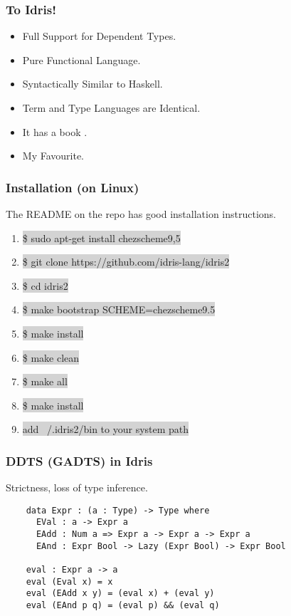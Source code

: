 \documentclass[hyperref={colorlinks = true,linkcolor = blue, citecolor = blue, urlcolor = blue}]{beamer}
\begin{document}
\begin{frame}[fragile]
  \frametitle{To Idris!}
  \begin{itemize}
    \item Full Support for Dependent Types.
    \item Pure Functional Language.
    \item Syntactically Similar to Haskell.
    \item Term and Type Languages are Identical.
    \item It has a book \citep{brady2017type}.
    \item My Favourite.
  \end{itemize}
\end{frame}

\begin{frame}[fragile]
  \frametitle{Installation (on Linux)}
  The README on the repo has good installation instructions.
  \begin{enumerate}
    \item \colorbox{lightgray}{\$ sudo apt-get install chezscheme9,5}
    \item \colorbox{lightgray}{\$ git clone https://github.com/idris-lang/idris2}
    \item \colorbox{lightgray}{\$ cd idris2}
    \item \colorbox{lightgray}{\$ make bootstrap SCHEME=chezscheme9.5}
    \item \colorbox{lightgray}{\$ make install}
    \item \colorbox{lightgray}{\$ make clean}
    \item \colorbox{lightgray}{\$ make all}
    \item \colorbox{lightgray}{\$ make install}
    \item \colorbox{lightgray}{add ~/.idris2/bin to your system path}
  \end{enumerate}
\end{frame}

\begin{frame}[fragile]
  \frametitle{DDTS (GADTS) in Idris}
  Strictness, loss of type inference.
  \begin{verbatim}
    data Expr : (a : Type) -> Type where
      EVal : a -> Expr a
      EAdd : Num a => Expr a -> Expr a -> Expr a
      EAnd : Expr Bool -> Lazy (Expr Bool) -> Expr Bool

    eval : Expr a -> a
    eval (Eval x) = x
    eval (EAdd x y) = (eval x) + (eval y)
    eval (EAnd p q) = (eval p) && (eval q)
  \end{verbatim}
\end{frame}
\end{document}
